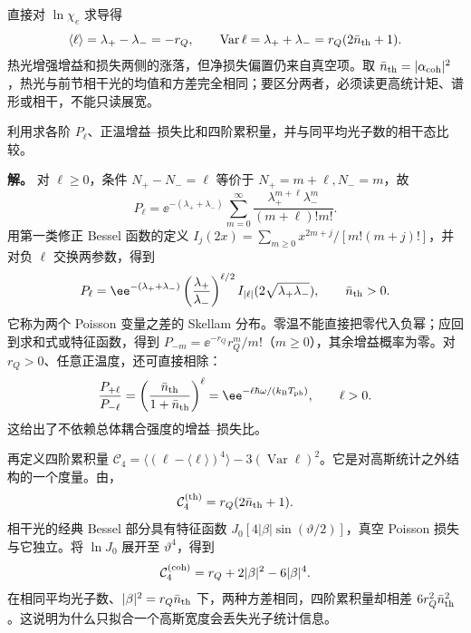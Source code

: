 直接对 $\ln\chi_e$ 求导得
\begin{equation}
 \langle\ell\rangle=\lambda_+-\lambda_-=-r_Q,\qquad
 \operatorname{Var}\ell=\lambda_++\lambda_-=r_Q(2\bar n_{\rm th}+1).
 \label{eq:electron-thermal-moments}
\end{equation}
热光增强增益和损失两侧的涨落，但净损失偏置仍来自真空项。取 $\bar n_{\rm th}=|\alpha_{\rm coh}|^2$，热光与前节相干光的均值和方差完全相同；要区分两者，必须读更高统计矩、谱形或相干，不能只读展宽。

\begin{exbox}[解析恢复热交换概率并比较四阶累积量]
利用求各阶 $P_\ell$、正温增益--损失比和四阶累积量，并与同平均光子数的相干态比较。

\textbf{解。} 对 $\ell\ge0$，条件 $N_+-N_-=\ell$ 等价于 $N_+=m+\ell,N_-=m$，故
\begin{equation*}
 P_\ell=\ee^{-(\lambda_++\lambda_-)}
 \sum_{m=0}^\infty\frac{\lambda_+^{m+\ell}\lambda_-^m}{(m+\ell)!m!}.
\end{equation*}
用第一类修正 Bessel 函数的定义
$I_j(2x)=\sum_{m\ge0}x^{2m+j}/[m!(m+j)!]$，并对负 $\ell$ 交换两参数，得到
\begin{equation*}
 P_\ell=\ee^{-(\lambda_++\lambda_-)}
 \left(\frac{\lambda_+}{\lambda_-}\right)^{\ell/2}
 I_{|\ell|}(2\sqrt{\lambda_+\lambda_-}),\qquad \bar n_{\rm th}>0.
\end{equation*}
它称为两个 Poisson 变量之差的 Skellam 分布。零温不能直接把零代入负幂；应回到求和式或特征函数，得到
$P_{-m}=\ee^{-r_Q}r_Q^m/m!$（$m\ge0$），其余增益概率为零。对 $r_Q>0$、任意正温度，还可直接相除：
\begin{equation*}
 \frac{P_{+\ell}}{P_{-\ell}}
 =\left(\frac{\bar n_{\rm th}}{1+\bar n_{\rm th}}\right)^\ell
 =\ee^{-\ell\hbar\omega/(k_{\rm B}T_{\rm ph})},\qquad\ell>0.
\end{equation*}
这给出了不依赖总体耦合强度的增益--损失比。

再定义四阶累积量 $\mathcal C_4=\langle(\ell-\langle\ell\rangle)^4\rangle-3(\operatorname{Var}\ell)^2$。它是对高斯统计之外结构的一个度量。由，
\begin{equation*}
 \mathcal C_4^{\rm(th)}=r_Q(2\bar n_{\rm th}+1).
\end{equation*}
相干光的经典 Bessel 部分具有特征函数 $J_0[4|\beta|\sin(\vartheta/2)]$，真空 Poisson 损失与它独立。将 $\ln J_0$ 展开至 $\vartheta^4$，得到
\begin{equation*}
 \mathcal C_4^{\rm(coh)}=r_Q+2|\beta|^2-6|\beta|^4.
\end{equation*}
在相同平均光子数、$|\beta|^2=r_Q\bar n_{\rm th}$ 下，两种方差相同，四阶累积量却相差 $6r_Q^2\bar n_{\rm th}^2$。这说明为什么只拟合一个高斯宽度会丢失光子统计信息。
\end{exbox}

